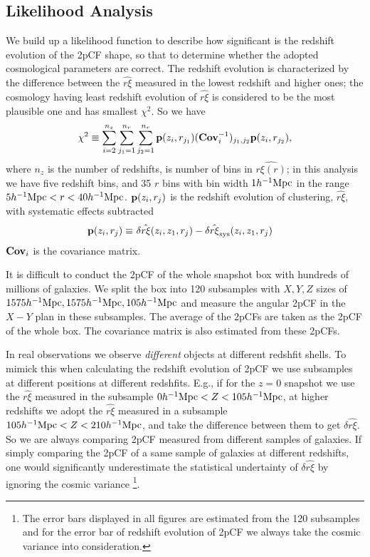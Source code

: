 \documentclass[iop]{emulateapj}
\begin{document}
\subsection{Likelihood Analysis}

We build up a likelihood function to 
describe how significant is the redshift evolution of the 2pCF shape,
so that to determine whether the adopted cosmological parameters are correct.
The redshift evolution is characterized by the difference between the $\hat{r\xi}$ measured in the lowest redshift and higher ones;
the cosmology having least redshift evolution of $\hat{r\xi}$ is considered to be the most plausible one and has smallest $\chi^2$.
So we have
\begin{equation}\label{eq:chisq1}
\chi^2\equiv \sum_{i=2}^{n_{z}} \sum_{j_1=1}^{n_{r}} \sum_{j_2=1}^{n_{r}} {\bf p}(z_i,r_{j_1}) ({\bf Cov}_{i}^{-1})_{j_1,j_2}  {\bf p}(z_i,r_{j_2}),
\end{equation}
where $n_z$ is the number of redshifts, 
is number of bins in $\hat{r\xi(r)}$;
in this analysis we have five redshift bins, 
and 35 $r$ bins with bin width $1h^{-1}\rm Mpc$ in the range $5h^{-1}{\rm Mpc}<r<40h^{-1}{\rm Mpc}$.
${\bf p}(z_i,r_{j})$ is the redshift evolution of clustering, 
$\hat {r\xi}$, with systematic effects subtracted
\begin{eqnarray}\label{eq:bfp}
 {\bf p}(z_i,r_{j}) \equiv&\ \delta \hat{r\xi}(z_i,z_1,r_j) - \delta \hat{r\xi}_{\rm sys}(z_i,z_1,r_j)
\end{eqnarray}
${\bf Cov}_i$ is the covariance matrix.

It is difficult to conduct the 2pCF of the whole snapshot box with hundreds of millions of galaxies.
We split the box into 120 subsamples with $X,Y,Z$ sizes of $1575h^{-1}{\rm Mpc},1575h^{-1}{\rm Mpc}, 105h^{-1}{\rm Mpc}$
and measure the angular 2pCF in the $X-Y$ plan in these subsamples. 
The average of the 2pCFs are taken as the 2pCF of the whole box.
The covariance matrix is also estimated from these 2pCFs.

In real observations we observe {\it different} objects at different redshfit shells.
To mimick this when calculating the redshift evolution of 2pCF we use subsamples at different positions at different redshfits.
E.g., if for the $z=0$ snapshot we use the $\hat{r\xi}$ measured in the subsample $0h^{-1}{\rm Mpc}<Z<105 h^{-1}{\rm Mpc}$,
at higher redshifts we adopt the $\hat{r\xi}$ measured in a subsample $105h^{-1}{\rm Mpc}<Z<210 h^{-1}{\rm Mpc}$,
and take the difference between them to get $\delta \hat{r\xi}$.
So we are always comparing 2pCF measured from different samples of galaxies.
If simply comparing the 2pCF of a same sample of galaxies at different redshifts, 
one would significantly underestimate the statistical undertainty of $\delta \hat{r\xi}$ by ignoring the cosmic variance
\footnote{The error bars displayed in all figures are estimated from the 120 subsamples and for the error bar of redshift evolution of 2pCF 
we always take the cosmic variance into consideration.}.
\end{document}
